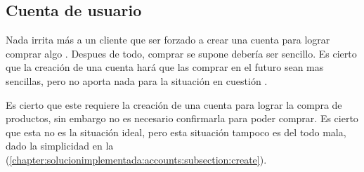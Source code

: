 \subsection{Cuenta de usuario}\label{chapter:solucionimplementada:section:account}

	Nada irrita más a un cliente que ser forzado a crear una cuenta para lograr comprar algo \online. Despues de todo, comprar \online se supone debería ser sencillo. Es cierto que la creación de una cuenta hará que las comprar en el futuro sean mas sencillas, pero no aporta nada para la situación en cuestión \cite{online_official_imediaconnection_best_practices_shopping_cart}.

	Es cierto que este \frameworkPC requiere la creación de una cuenta para lograr la compra de productos, sin embargo no es necesario confirmarla para poder comprar. Es cierto que esta no es la situación ideal, pero esta situación tampoco es del todo mala, dado la simplicidad en la  (\ref{chapter:solucionimplementada:accounts:subsection:create}). 